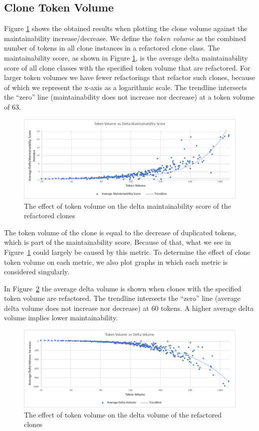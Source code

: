 \subsection{Clone Token Volume}
Figure \ref{fig:maintainabilityscore} shows the obtained results when plotting the clone volume against the maintainability increase/decrease. We define the \textit{token volume} as the combined number of tokens in all clone instances in a refactored clone class. The maintainability score, as shown in Figure \ref{fig:maintainabilityscore}, is the average delta maintainability score of all clone classes with the specified token volume that are refactored. For larger token volumes we have fewer refactorings that refactor such clones, because of which we represent the x-axis as a logarithmic scale. The trendline intersects the ``zero'' line (maintainability does not increase nor decrease) at a token volume of 63.

\begin{figure}[H]
  \includegraphics[width=1\textwidth]{img/maintainabilityscore}
  \caption{The effect of token volume on the delta maintainability score of the refactored clones}
  \label{fig:maintainabilityscore}
\end{figure}

The token volume of the clone is equal to the decrease of duplicated tokens, which is part of the maintainability score. Because of that, what we see in Figure~\ref{fig:maintainabilityscore} could largely be caused by this metric. To determine the effect of clone token volume on each metric, we also plot graphs in which each metric is considered singularly.

In Figure~\ref{fig:volume} the average delta volume is shown when clones with the specified token volume are refactored. The trendline intersects the ``zero'' line (average delta volume does not increase nor decrease) at 60 tokens. A higher average delta volume implies lower maintainability.

\begin{figure}[]
  \includegraphics[width=1\textwidth]{img/volume}
  \caption{The effect of token volume on the delta volume of the refactored clones}
  \label{fig:volume}
\end{figure}

